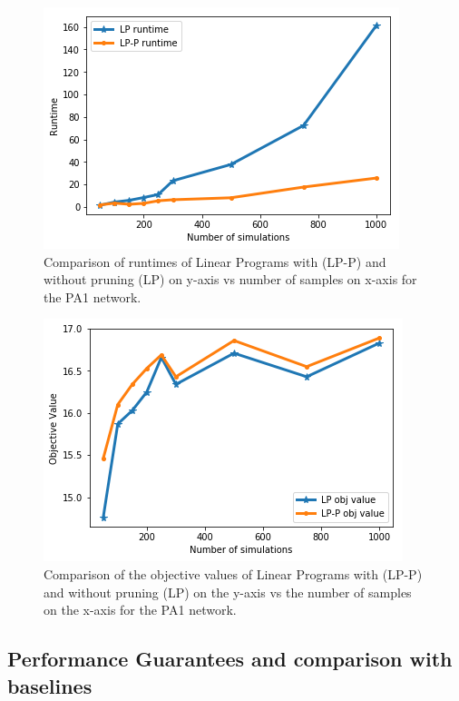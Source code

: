 \begin{figure}[!h]
    \centering
    \includegraphics[scale = 0.6]{Figuresnew/pa1_runtime}
    \caption{Comparison of runtimes of Linear Programs with (LP-P) and without pruning (LP) on y-axis vs 
number of samples on x-axis for the PA1 network. }
    \label{fig:pa1pruningtime}
\end{figure}



\begin{figure}[!h]
    \centering
    \includegraphics[scale = 0.55]{Figuresnew/pa1_objpruning}
    \caption{Comparison of the objective values of Linear Programs with (LP-P) and without pruning (LP) on the y-axis
vs the number of samples on the x-axis for the PA1 network. }
    \label{fig:pa1pruningobj}
\end{figure}

\subsection{Performance Guarantees and comparison with baselines}

